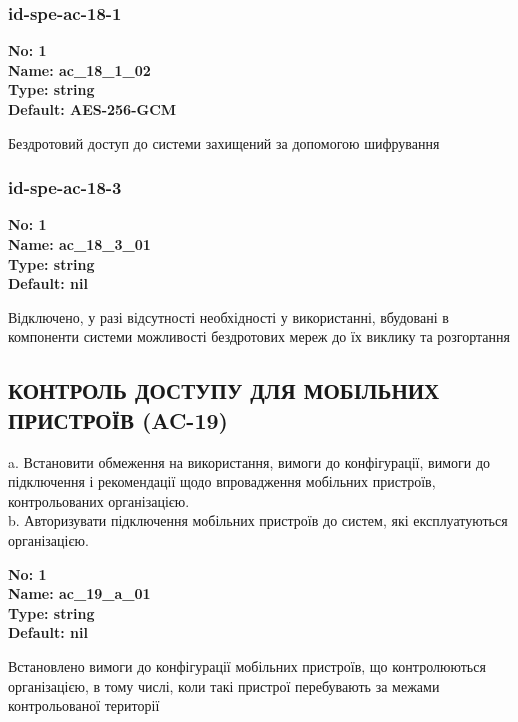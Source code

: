 \documentclass{article}
\begin{document}
\subsubsection{id-spe-ac-18-1}


\vspace{10pt}
{\footnotesize\bfseries
No: 1\\
Name: ac\_\allowbreak{}18\_\allowbreak{}1\_\allowbreak{}02\\
Type: string\\
Default: \textquotedbl{}AES-256-GCM\textquotedbl{}
}

{\footnotesize Бездротовий доступ до системи захищений за допомогою шифрування}




\subsubsection{id-spe-ac-18-3}


\vspace{10pt}
{\footnotesize\bfseries
No: 1\\
Name: ac\_\allowbreak{}18\_\allowbreak{}3\_\allowbreak{}01\\
Type: string\\
Default: nil
}

{\footnotesize Відключено, у разі відсутності необхідності у використанні, вбудовані в компоненти системи можливості бездротових мереж до їх виклику та розгортання}




\subsection{КОНТРОЛЬ ДОСТУПУ ДЛЯ МОБІЛЬНИХ ПРИСТРОЇВ (AC-19)}
a. Встановити обмеження на використання, вимоги до конфігурації, вимоги до підключення і рекомендації щодо впровадження мобільних пристроїв, контрольованих організацією.\\ 
b. Авторизувати підключення мобільних пристроїв до систем, які експлуатуються організацією.

\vspace{10pt}
{\footnotesize\bfseries
No: 1\\
Name: ac\_\allowbreak{}19\_\allowbreak{}a\_\allowbreak{}01\\
Type: string\\
Default: nil
}

{\footnotesize Встановлено вимоги до конфігурації мобільних пристроїв, що контролюються організацією, в тому числі, коли такі пристрої перебувають за межами контрольованої території}
\end{document}
